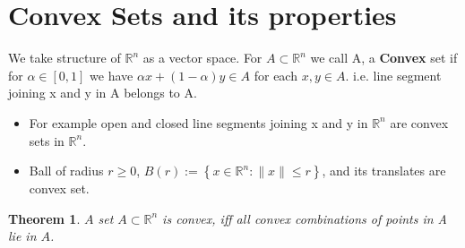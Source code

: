 \documentclass[oneside]{book}
\newtheorem{theorem}{Theorem}[section]
\begin{document}
	
	
	
	
	
	
	
	
	
	
	
	
	
	
	
	
	
	
	
	
	
	
	
	
	
	
	
	
	
	
	
	
	
	
	
	
	
	
	
	\section{Convex Sets and its properties } \label{s:4}
	We take structure of  $\mathbb{R}^n$ as a vector space. 
	For $ A \subset \mathbb{R}^n$ we call A, a \textbf{Convex} set  if for $\alpha \in [0,1]$ we have $\alpha x +(1- \alpha)y \in A $ for each  $x, y \in A.$  i.e. line segment joining x and y in A belongs to A.\\
	\begin{itemize}
		\item  For example open and closed line segments joining x and y in $\mathbb{R}^n$ are convex sets in $\mathbb{R}^n$.
		
		\item  
		
		Ball of radius $r \geq 0$,  $B (r):=\left\{x \in \mathbb{R}^{n}:\|x\| \leq r\right\}$,  and its translates are convex set.
		
	\end{itemize}
	
	
	\begin{theorem}
		\label{t:4.5}
		$A$ set $A \subset \mathbb{R}^{n}$ is convex, iff  all convex combinations of points in A lie
		in $A$.
	\end{theorem}
	
\end{document}
